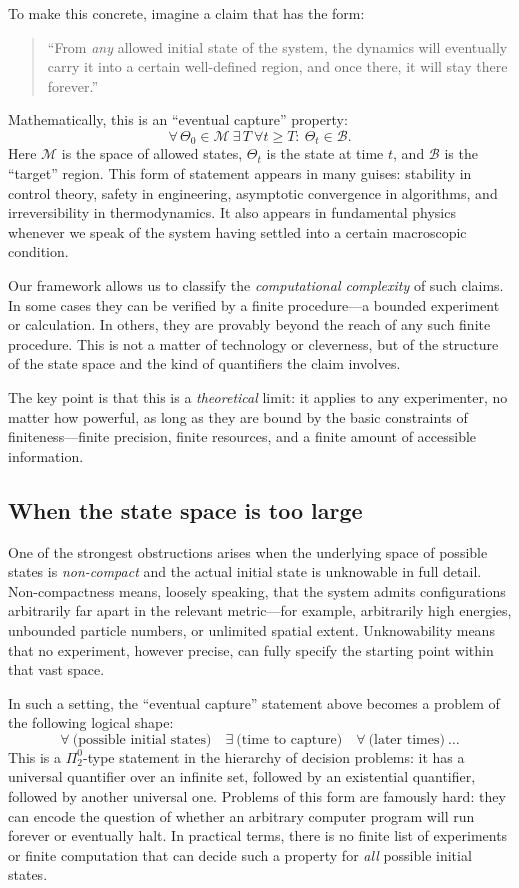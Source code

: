 \documentclass[12pt]{article}
\theoremstyle{definition}
\theoremstyle{plain}
\begin{document}
To make this concrete, imagine a claim that has the form:

\begin{quote}
``From \emph{any} allowed initial state of the system, the dynamics will
eventually carry it into a certain well-defined region, and once there, it will
stay there forever.''
\end{quote}

Mathematically, this is an ``eventual capture'' property:
\[
\forall\,\Theta_0 \in \mathcal{M}\ \exists\,T\ \forall t \ge T:\ 
\Theta_t \in \mathcal{B}.
\]
Here $\mathcal{M}$ is the space of allowed states, $\Theta_t$ is the state at
time $t$, and $\mathcal{B}$ is the ``target'' region. This form of statement
appears in many guises: stability in control theory, safety in engineering,
asymptotic convergence in algorithms, and irreversibility in thermodynamics.
It also appears in fundamental physics whenever we speak of the system having
settled into a certain macroscopic condition.

Our framework allows us to classify the \emph{computational complexity} of such
claims. In some cases they can be verified by a finite procedure---a bounded
experiment or calculation. In others, they are provably beyond the reach of
any such finite procedure. This is not a matter of technology or cleverness,
but of the structure of the state space and the kind of quantifiers the claim
involves. 

The key point is that this is a \emph{theoretical} limit: it applies to any
experimenter, no matter how powerful, as long as they are bound by the basic
constraints of finiteness---finite precision, finite resources, and a finite
amount of accessible information.

\subsection{When the state space is too large}

One of the strongest obstructions arises when the underlying space of possible
states is \emph{non-compact} and the actual initial state is unknowable in full
detail. Non-compactness means, loosely speaking, that the system admits
configurations arbitrarily far apart in the relevant metric---for example,
arbitrarily high energies, unbounded particle numbers, or unlimited spatial
extent. Unknowability means that no experiment, however precise, can fully
specify the starting point within that vast space.

In such a setting, the ``eventual capture'' statement above becomes a problem
of the following logical shape:
\[
\forall\ \text{(possible initial states)}\quad
\exists\ \text{(time to capture)}\quad
\forall\ \text{(later times)}\ \ldots
\]
This is a \(\Pi^0_2\)-type statement in the hierarchy of decision problems: it
has a universal quantifier over an infinite set, followed by an existential
quantifier, followed by another universal one. Problems of this form are
famously hard: they can encode the question of whether an arbitrary computer
program will run forever or eventually halt. In practical terms, there is no
finite list of experiments or finite computation that can decide such a
property for \emph{all} possible initial states.
\end{document}

